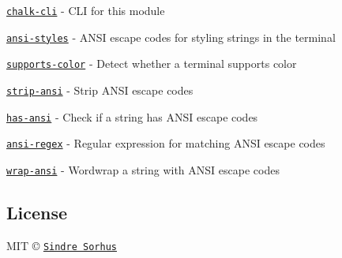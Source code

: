 \begin{DoxyItemize}
\item \href{https://github.com/chalk/chalk-cli}{\tt chalk-\/cli} -\/ C\+L\+I for this module
\item \href{https://github.com/chalk/ansi-styles/}{\tt ansi-\/styles} -\/ A\+N\+S\+I escape codes for styling strings in the terminal
\item \href{https://github.com/chalk/supports-color/}{\tt supports-\/color} -\/ Detect whether a terminal supports color
\item \href{https://github.com/chalk/strip-ansi}{\tt strip-\/ansi} -\/ Strip A\+N\+S\+I escape codes
\item \href{https://github.com/chalk/has-ansi}{\tt has-\/ansi} -\/ Check if a string has A\+N\+S\+I escape codes
\item \href{https://github.com/chalk/ansi-regex}{\tt ansi-\/regex} -\/ Regular expression for matching A\+N\+S\+I escape codes
\item \href{https://github.com/chalk/wrap-ansi}{\tt wrap-\/ansi} -\/ Wordwrap a string with A\+N\+S\+I escape codes
\end{DoxyItemize}

\subsection*{License}

M\+I\+T © \href{http://sindresorhus.com}{\tt Sindre Sorhus} 
